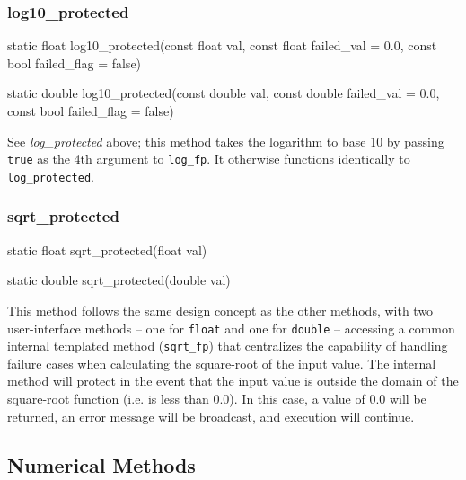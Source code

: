 \documentclass[11pt,fleqn]{report}
\begin{document}
\subsubsection{log10\_protected}
\begin{code}
static float log10_protected(const float val,
                             const float failed_val = 0.0,
                             const bool failed_flag = false)

static double log10_protected(const double val,
                              const double failed_val = 0.0,
                              const bool failed_flag = false)
\end{code}

See \textit{log\_protected} above; this method takes the logarithm to base
10 by passing \texttt{true} as the 4th argument to \texttt{log\_fp}.
It otherwise functions identically to \texttt{log\_protected}.

\subsubsection{sqrt\_protected}
\begin{code}
static float sqrt_protected(float val)

static double sqrt_protected(double val)
\end{code}

This method follows the same design concept as the other methods, 
with two user-interface methods -- one for \texttt{float} and one 
for \texttt{double} -- accessing a common internal templated method 
(\texttt{sqrt\_fp}) that centralizes the capability of handling
failure cases when calculating the square-root of the input value. The 
internal method will protect in the event that the input value is outside
the domain of the square-root function (i.e. is less than 0.0). In this case,
a value of 0.0 will be returned, an error message will be broadcast, and 
execution will continue.

\subsection{Numerical Methods}
\end{document}
